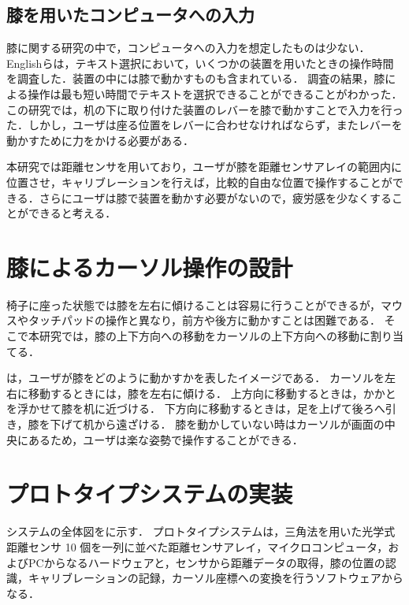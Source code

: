 \documentclass[submit, techrep]{ipsj}
\begin{document}
\subsection{膝を用いたコンピュータへの入力}
膝に関する研究の中で，コンピュータへの入力を想定したものは少ない．
Englishら\cite{1698228}は，テキスト選択において，いくつかの装置を用いたときの操作時間を調査した．装置の中には膝で動かすものも含まれている．
調査の結果，膝による操作は最も短い時間でテキストを選択できることができることがわかった．
この研究では，机の下に取り付けた装置のレバーを膝で動かすことで入力を行った．しかし，ユーザは座る位置をレバーに合わせなければならず，またレバーを動かすために力をかける必要がある．\par
本研究では距離センサを用いており，ユーザが膝を距離センサアレイの範囲内に位置させ，キャリブレーションを行えば，比較的自由な位置で操作することができる．さらにユーザは膝で装置を動かす必要がないので，疲労感を少なくすることができると考える．

\section{膝によるカーソル操作の設計}
椅子に座った状態では膝を左右に傾けることは容易に行うことができるが，マウスやタッチパッドの操作と異なり，前方や後方に動かすことは困難である．
そこで本研究では，膝の上下方向への移動をカーソルの上下方向への移動に割り当てる．\par
{}は，ユーザが膝をどのように動かすかを表したイメージである．
カーソルを左右に移動するときには，膝を左右に傾ける．
上方向に移動するときは，かかとを浮かせて膝を机に近づける．
下方向に移動するときは，足を上げて後ろへ引き，膝を下げて机から遠ざける．
膝を動かしていない時はカーソルが画面の中央にあるため，ユーザは楽な姿勢で操作することができる．

\section{プロトタイプシステムの実装}
システムの全体図をに示す．
プロトタイプシステムは，三角法を用いた光学式距離センサ 10 個を一列に並べた距離センサアレイ，マイクロコンピュータ，およびPCからなるハードウェアと，センサから距離データの取得，膝の位置の認識，キャリブレーションの記録，カーソル座標への変換を行うソフトウェアからなる．
\end{document}
